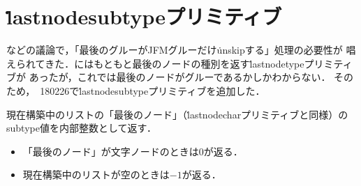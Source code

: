 \documentclass[a4paper,11pt,nomag]{jsarticle}
\begin{document}
\section{\.{lastnodesubtype}プリミティブ}
\cite{tjb28,plt63}などの議論で，「最後のグルーがJFMグルーだけ\.{unskip}する」処理の必要性が
唱えられてきた．\epTeX にはもともと最後のノードの種別を返す\.{lastnodetype}プリミティブが
あったが，これでは最後のノードがグルーであるかしかわからない．
そのため，\epTeX~180226で\.{lastnodesubtype}プリミティブを追加した．

\begin{cslist}
  現在構築中のリストの「最後のノード」（\.{lastnodechar}プリミティブと同様）の
  subtype値を内部整数として返す．
  \begin{itemize}
    \item 「最後のノード」が文字ノードのときは0が返る．
    \item 現在構築中のリストが空のときは$-1$が返る．
  \end{itemize}
\end{cslist}
\end{document}
